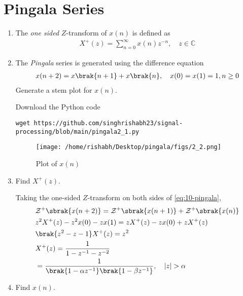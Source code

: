 \documentclass[journal,12pt,twocolumn]{IEEEtran}
\renewcommand\thesection{\arabic{section}}
\begin{document}
	\section{Pingala Series}
	\begin{enumerate}[label=\thesection.\arabic*,ref=\thesection.\theenumi]
		\item The {\em one sided} $Z$-transform of $x(n)$ is defined as 
		\begin{align}
			X^{+}(z) = \sum_{n = 0}^{\infty}x(n)z^{-n}, \quad z \in \mathbb{C}
			\label{eq:one-Z}
		\end{align}
		\item The {\em Pingala} series is generated using the difference equation 
		\begin{align}
			x(n+2) = x\brak{n+1} + x\brak{n},  \quad x(0) = x(1) = 1, n \ge 0
			\label{eq:10-pingala}
		\end{align}
		Generate a stem plot for $x(n)$.
		
		\solution
		Download the Python code
		\begin{lstlisting}
wget https://github.com/singhrishabh23/signal-processing/blob/main/pingala2_1.py
		\end{lstlisting}
		\begin{figure}[!htp]
			\texttt{[image: /home/rishabh/Desktop/pingala/figs/2\_2.png]}
			\caption{Plot of $x(n)$}
			\label{fig:xn}
		\end{figure}
		
		\newpage
		\item Find $X^{+}(z)$.
		
		\solution Taking the one-sided $Z$-transform on both sides of \eqref{eq:10-pingala},
		\begin{align}
			&\mathcal{Z}^+\sbrak{x(n + 2)} = \mathcal{Z}^+\sbrak{x(n + 1)} + \mathcal{Z}^+\sbrak{x(n)} \\
			&z^2X^+(z) - z^2x(0) - zx(1) = zX^+(z) - zx(0) + zX^+(z) \\
			&\brak{z^2 - z - 1}X^+(z) = z^2 \\
			&X^+(z) = \frac{1}{1 - z^{-1} - z^{-2}} \\
			&= \frac{1}{\brak{1 - \alpha z^{-1}}\brak{1 - \beta z^{-1}}}, \quad |z| > \alpha
			\label{eq:X-z}
		\end{align}
		\item Find $x(n)$.
		

\end{enumerate}
\end{document}
